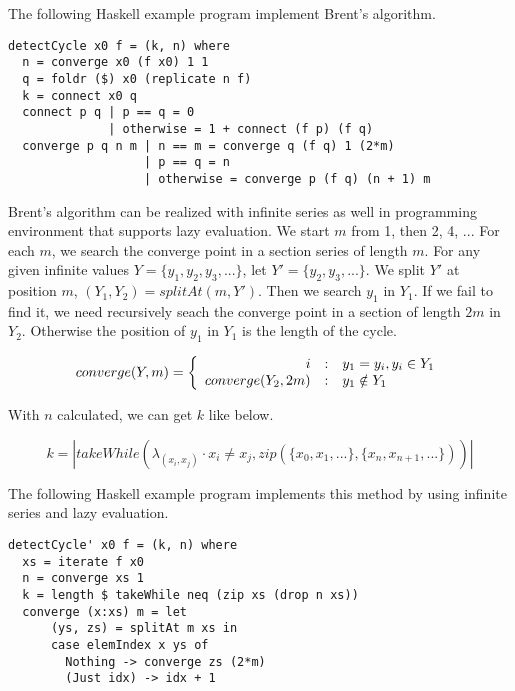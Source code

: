 \documentclass{article}
\begin{document}
The following Haskell example program implement Brent's algorithm.

\lstset{language=Haskell}
\begin{lstlisting}
detectCycle x0 f = (k, n) where
  n = converge x0 (f x0) 1 1
  q = foldr ($) x0 (replicate n f)
  k = connect x0 q
  connect p q | p == q = 0
              | otherwise = 1 + connect (f p) (f q)
  converge p q n m | n == m = converge q (f q) 1 (2*m)
                   | p == q = n
                   | otherwise = converge p (f q) (n + 1) m
\end{lstlisting}

Brent's algorithm can be realized with infinite series as well in programming environment that supports
lazy evaluation. We start $m$ from 1, then 2, 4, ... For each $m$, we search the converge point in
a section series of length $m$. For any given infinite values $Y = \{y_1, y_2, y_3, ...\}$, let
$Y' = \{y_2, y_3, ...\}$. We split $Y'$ at position $m$,
$(Y_1, Y_2) = splitAt(m, Y')$. Then we search $y_1$ in $Y_1$. If we fail to find it, we need
recursively seach the converge point in a section of length $2m$ in $Y_2$. Otherwise the
position of $y_1$ in $Y_1$ is the length of the cycle.

\begin{equation}
converge(Y, m) = \left \{
  \begin{array}
  {r@{\quad:\quad}l}
  i & y_1 = y_i, y_i \in Y_1 \\
  converge(Y_2, 2m) & y_1 \notin Y_1
  \end{array}
\right.
\end{equation}

With $n$ calculated, we can get $k$ like below.

\begin{equation}
k = |takeWhile(\lambda_{(x_i, x_j)} \cdot x_i \neq x_j, zip(\{x_0, x_1, ... \}, \{x_{n}, x_{n+1}, ...\}))|
\end{equation}

The following Haskell example program implements this method by using infinite series and lazy evaluation.

\lstset{language=Haskell}
\begin{lstlisting}
detectCycle' x0 f = (k, n) where
  xs = iterate f x0
  n = converge xs 1
  k = length $ takeWhile neq (zip xs (drop n xs))
  converge (x:xs) m = let
      (ys, zs) = splitAt m xs in
      case elemIndex x ys of
        Nothing -> converge zs (2*m)
        (Just idx) -> idx + 1
\end{lstlisting}
\end{document}
